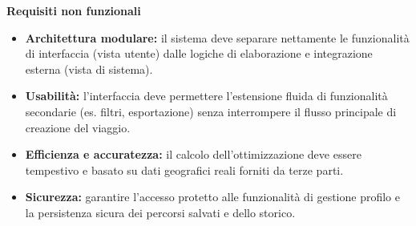 \textbf{Requisiti non funzionali}
\begin{itemize}
    \item \textbf{Architettura modulare:} il sistema deve separare nettamente le funzionalità di interfaccia (vista utente) dalle logiche di elaborazione e integrazione esterna (vista di sistema).
    \item \textbf{Usabilità:} l'interfaccia deve permettere l'estensione fluida di funzionalità secondarie (es. filtri, esportazione) senza interrompere il flusso principale di creazione del viaggio.
    \item \textbf{Efficienza e accuratezza:} il calcolo dell'ottimizzazione deve essere tempestivo e basato su dati geografici reali forniti da terze parti.
    \item \textbf{Sicurezza:} garantire l'accesso protetto alle funzionalità di gestione profilo e la persistenza sicura dei percorsi salvati e dello storico.
\end{itemize}